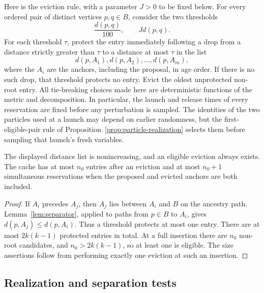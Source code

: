 Here is the eviction rule, with a parameter $J>0$ to be fixed below.
For every ordered pair of distinct vertices $p,q\in B$, consider the two
thresholds
\begin{equation}\label{eq:cache-thresholds}
 \frac{d(p,q)}{100},\qquad Jd(p,q).
\end{equation}
For each threshold $\tau$, protect the entry immediately following a drop
from a distance strictly greater than $\tau$ to a distance at most $\tau$
in the list
\[
 d(p,A_1),d(p,A_2),\ldots,d(p,A_m),
\]
where the $A_i$ are the anchors, including the proposal, in age order.
If there is no such drop, that threshold protects no entry.  Evict the
oldest unprotected non-root entry.  All tie-breaking choices made here
are deterministic functions of the metric and decomposition.
In particular, the launch and release times of every reservation are fixed
before any perturbation is sampled.  The identities of the two particles
used at a launch may depend on earlier randomness, but the first-eligible-pair
rule of Proposition~\ref{prop:particle-realization} selects them before
sampling that launch's fresh variables.

\begin{lemma}\label{lem:cache-defined}
The displayed distance list is nonincreasing, and an eligible eviction
always exists.  The cache has at most $n_0$ entries after an eviction and
at most $n_0+1$ simultaneous reservations when the proposed and evicted
anchors are both included.
\end{lemma}

\begin{proof}
If $A_i$ precedes $A_j$, then $A_j$ lies between $A_i$ and $B$ on the
ancestry path.  Lemma~\ref{lem:separator}, applied to paths from $p\in B$
to $A_i$, gives $d(p,A_j)\leq d(p,A_i)$.  Thus a threshold protects at
most one entry.  There are at most $2k(k-1)$ protected entries in total.
At a full insertion there are $n_0$ non-root candidates, and
$n_0>2k(k-1)$, so at least one is eligible.  The size assertions follow
from performing exactly one eviction at such an insertion.
\end{proof}

\subsection{Realization and separation tests}


